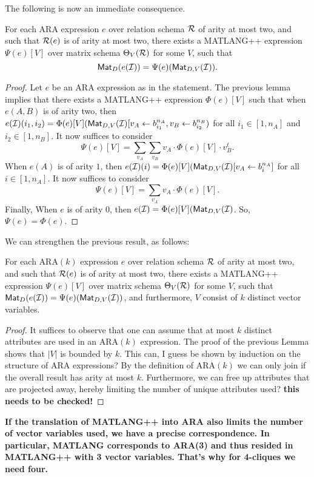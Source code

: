 The following is now an immediate consequence.
\begin{prop}
For each ARA expression $e$ over relation schema $\mathcal{R}$ of arity at most two, and such that $\mathcal{R}(e)$ is of arity at most two,  there exists a MATLANG++ expression $\Psi(e)[V]$ over  matrix schema $\Theta_V(\mathcal{R})$ for some $V$, such that 
$$
\mathsf{Mat}_{D}(e(\mathcal{I}))=\Psi(e)(\mathsf{Mat}_{D,V}(\mathcal{I})).
$$
\end{prop}
\begin{proof}
Let $e$ be an ARA expression as in the statement. The previous lemma implies that there exists a MATLANG++ expression $\Phi(e)[V]$ such that when $e(A,B)$ is of arity two, then $e(\mathcal{I})(i_1,i_2)=\Phi(e)[V](\mathsf{Mat}_{D,V}(\mathcal{I})[v_{A}\gets b_{i_1}^{n_A},v_B\gets b_{i_2}^{n_B})$ for all $i_1\in[1,n_A]$ and $i_2\in [1,n_B]$. It now suffices to consider 
$$
\Psi(e)[V]= \sum_{v_A}\sum_{v_B} v_A\cdot \Phi(e)[V]\cdot  v_B^t.
$$
When $e(A)$ is of arity $1$, then 
$e(\mathcal{I})(i)=\Phi(e)[V](\mathsf{Mat}_{D,V}(\mathcal{I})[v_{A}\gets b_{i}^{n_A}]$ for all $i\in[1,n_A]$. It now suffices to consider 
$$
\Psi(e)[V]= \sum_{v_A} v_A\cdot \Phi(e)[V].
$$
Finally, When $e$ is of arity $0$, then 
$e(\mathcal{I})=\Phi(e)[V](\mathsf{Mat}_{D,V}(\mathcal{I})$. So, $\Psi(e)=\Phi(e)$. 
\end{proof}

We can strengthen the previous result, as follows:
\begin{prop}
For each ARA$(k)$ expression $e$ over relation schema $\mathcal{R}$ of arity at most two, and such that $\mathcal{R}(e)$ is of arity at most two,  there exists a MATLANG++ expression $\Psi(e)[V]$ over  matrix schema $\Theta_V(\mathcal{R})$ for some $V$, such that $
\mathsf{Mat}_{D}(e(\mathcal{I}))=\Psi(e)(\mathsf{Mat}_{D,V}(\mathcal{I}))$, 
and furthermore, $V$ consist of $k$ distinct vector variables.
\end{prop}
\begin{proof}
It suffices to observe that one can assume that at most $k$ distinct attributes are used in an ARA$(k)$ expression. The proof of the previous Lemma shows that $|V|$ is bounded by $k$. This can, I guess be shown by induction on the structure of ARA expressions?
By the definition of ARA$(k)$ we can only join if the overall result has arity at most $k$.
Furthermore, we can free up attributes that are projected away, hereby limiting the number of unique attributes used?
\textbf{this needs to be checked!}
\end{proof}

{\bf If the translation of MATLANG++ into ARA also limits the number of vector variables used, we have a precise correspondence. In particular, MATLANG corresponds to ARA(3) and thus resided in MATLANG++ with 3 vector variables. That's why for 4-cliques we need four.}


